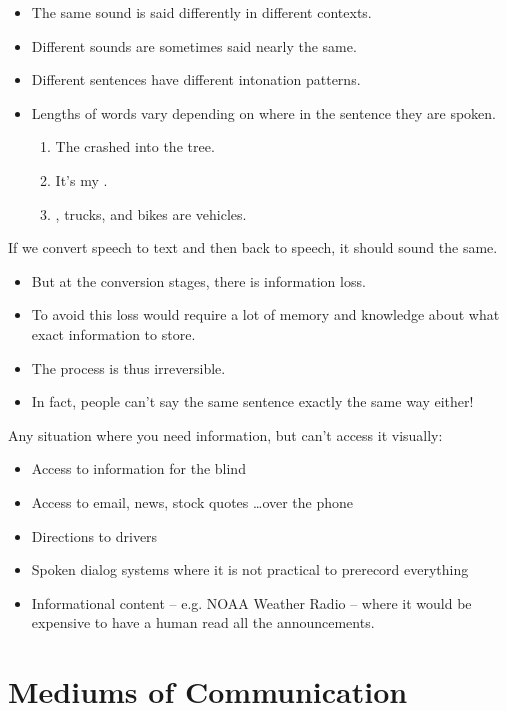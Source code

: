 \documentclass[a4paper,landscape,headrule,footrule,xetex]{foils}
\begin{document}
\begin{itemize}
\item The same sound is said differently in different contexts.
\item Different sounds are sometimes said nearly the same.
\item Different sentences have different intonation patterns. 
\item Lengths of words vary depending on where in the sentence they are spoken. 
    \begin{enumerate}
    \item The  crashed into the tree.
    \item It's my .
    \item {}, trucks, and bikes are vehicles.
    \end{enumerate}
  \end{itemize}







If we convert speech to text and then back to speech, it should sound the same.
\begin{itemize}
\item  But at the conversion stages, there is information loss.
\item To avoid this loss would require a lot of memory and knowledge about what exact information to store.
\item The process is thus irreversible.
\item In fact, people can't say the same sentence exactly the same way either!
\end{itemize}

Any situation where you need information, but can't access it visually:

\begin{itemize}
\item Access to information for the blind
\item Access to email, news, stock quotes \ldots over the phone
\item Directions to drivers
\item Spoken dialog systems where it is not practical to prerecord everything
\item Informational content – e.g. NOAA Weather Radio – where it would be expensive to have a human read all the announcements.
\end{itemize}
\section{Mediums of Communication}
\end{document}
